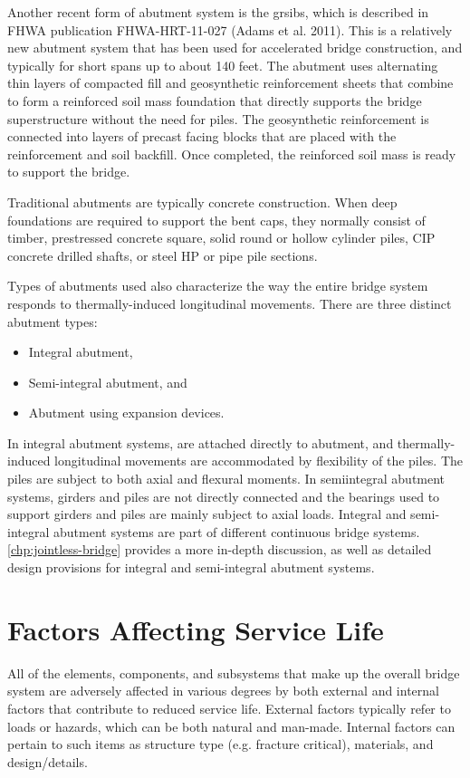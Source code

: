 Another recent form of abutment system is the \acrfull{grsibs}, which is described in FHWA publication FHWA-HRT-11-027 (Adams et al. 2011). This is a relatively new abutment system that has been used for accelerated bridge construction, and typically for short spans up to about 140 feet. The abutment uses alternating thin layers of compacted fill and geosynthetic reinforcement sheets that combine to form a reinforced soil mass foundation that directly supports the bridge superstructure without the need for piles. The geosynthetic reinforcement is connected into layers of precast facing blocks that are placed with the reinforcement and soil backfill. Once completed, the reinforced soil mass is ready to support the bridge.

Traditional abutments are typically concrete construction. When deep foundations are required to support the bent caps, they normally consist of timber, prestressed concrete square, solid round or hollow cylinder piles, CIP concrete drilled shafts, or steel HP or pipe pile sections.

Types of abutments used also characterize the way the entire bridge system responds to thermally-induced longitudinal movements. There are three distinct abutment types:
\begin{itemize}
  \item Integral abutment,
  \item Semi-integral abutment, and
  \item Abutment using expansion devices.
\end{itemize}

In integral abutment systems, are attached directly to abutment, and thermally-induced longitudinal movements are accommodated by flexibility of the piles. The piles are subject to both axial and flexural moments. In semiintegral abutment systems, girders and piles are not directly connected and the bearings used to support girders and piles are mainly subject to axial loads. Integral and semi-integral abutment systems are part of different continuous bridge systems. \cref{chp:jointless-bridge} provides a more in-depth discussion, as well as detailed design provisions for integral and semi-integral abutment systems.


\section{Factors Affecting Service Life}
\label{sec:factors-affect-sl}

All of the elements, components, and subsystems that make up the overall bridge system are adversely affected in various degrees by both external and internal factors that contribute to reduced service life. External factors typically refer to loads or hazards, which can be both natural and man-made. Internal factors can pertain to such items as structure type (e.g. fracture critical), materials, and design/details.

